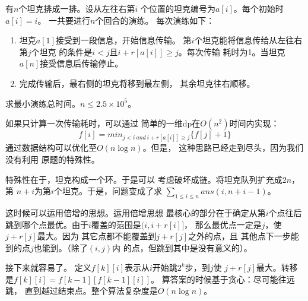 \begin{prob}
	有$n$个坦克排成一排。设从左往右第$i$
	个位置的坦克编号为$a[i]$。每个初始时$a[i] = i$。
	一共要进行$n$个回合的演练。
	每次演练如下：
	\begin{enumerate}
		\item 坦克$a[1]$接受到一段信息，开始信息传输。
			第$i$个坦克能将信息传给从左往右第$j$个坦克
			的条件是$i < j$且$i+r[a[i]] \ge j$。每次传输
			耗时为1。当坦克$a[n]$接受信息后传输停止。
		\item 完成传输后，最右侧的坦克将移到最左侧，
			其余坦克往右顺移。
	\end{enumerate}
	求最小演练总时间。$n \le 2.5 \times 10^5$。
\end{prob}

\begin{sol}
	如果只计算一次传输耗时，可以通过
	简单的一维dp在$O(n^2)$时间内实现：
	\begin{displaymath}
		f[i] = min_{j < i\ and\ i+r[a[i]] \ge j}\{ f[j]+1 \}
	\end{displaymath}
	通过数据结构可以优化至$O(n \log n)$。但是，
	这种思路已经走到尽头，因为我们没有利用
	原题的特殊性。\par
	特殊性在于，坦克构成一个环。于是可以
	考虑破坏成链。将坦克队列扩充成$2n$，第
	$n+i$为第$i$个坦克。于是，问题变成了求
	$\sum_{1 \le i \le n} ans(i,n+i-1)$。\par
	这时候可以运用倍增的思想。运用倍增思想
	最核心的部分在于确定从第$i$个点往后
	跳到哪个点最优。由于$i$覆盖的范围是$(i,i+r[i]]$，
	那么最优点一定是$j$，使$j+r[j]$最大。因为
	其它点都不能覆盖到$j+r[j]$之外的点，且
	其他点下一步能到的点$j$也能到。（除了$(i,j)$内
	的点，但跳到其中是没有意义的）。
	\par 接下来就容易了。
	定义$f[k][i]$表示从$i$开始跳$2^k$步，到$j$使
	$j+r[j]$最大。转移是$f[k][i] = f[k-1][f[k-1][i]]$。
	算答案的时候基于贪心：尽可能往远跳，
	直到越过结束点。整个算法复杂度是$O(n \log n)$。
\end{sol}

